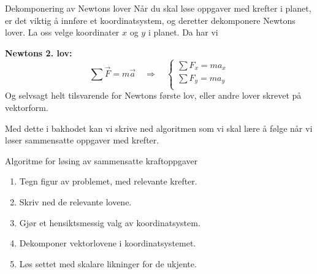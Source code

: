 \begin{myoppsum*}{Dekomponering av Newtons lover}
Når du skal løse oppgaver med krefter i planet, er det viktig å innføre et koordinatsystem, og deretter dekomponere Newtons lover. La oss velge koordinater $x$ og $y$ i planet. Da har vi

\medskip
\textbf{Newtons 2. lov:}
\[
  \sum\vec{F} = m\vec{a}\quad\Longrightarrow\quad
  \begin{cases}
    \sum F_x = m a_x\\[5pt]
    \sum F_y = m a_y\\[5pt]
  \end{cases}
\]
Og selvsagt helt tilsvarende for Newtons første lov, eller andre lover skrevet på vektorform.
\end{myoppsum*}
Med dette i bakhodet kan vi skrive ned algoritmen som vi skal lære å følge når vi løser sammensatte oppgaver med krefter.
\begin{myoppsum*}{Algoritme for løsing av sammensatte kraftoppgaver}
\begin{enumerate}
    \item Tegn figur av problemet, med relevante krefter.
    \item Skriv ned de relevante lovene.
    \item Gjør et hensiktsmessig valg av koordinatsystem.
    \item Dekomponer vektorlovene i koordinatsystemet.
    \item Løs settet med skalare likninger for de ukjente. 
\end{enumerate}
\end{myoppsum*}


